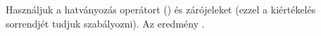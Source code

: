 Használjuk a hatványozás operátort (\mcode{\^}) és 
zárójeleket (ezzel a kiértékelés sorrendjét tudjuk szabályozni).
Az eredmény .
